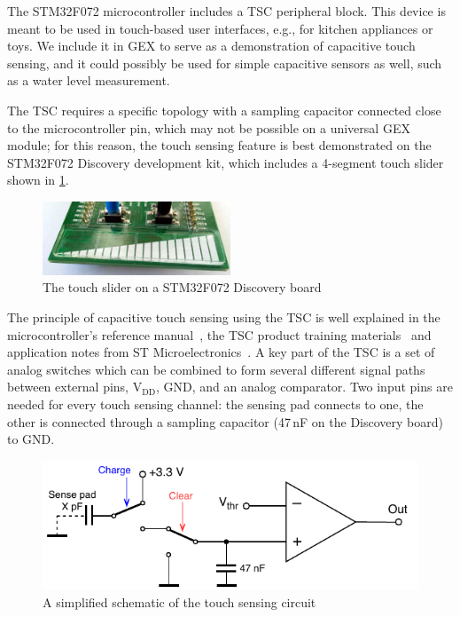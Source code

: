 The STM32F072 microcontroller includes a \gls{TSC} peripheral block. This device is meant to be used in touch-based user interfaces, e.g., for kitchen appliances or toys. We include it in GEX to serve as a demonstration of capacitive touch sensing, and it could possibly be used for simple capacitive sensors as well, such as a water level measurement.

The \gls{TSC} requires a specific topology with a sampling capacitor connected close to the microcontroller pin, which may not be possible on a universal GEX module; for this reason, the touch sensing feature is best demonstrated on the STM32F072 Discovery development kit, which includes a 4-segment touch slider shown in \cref{fig:disco_touch}.

\begin{figure}[h]
	\centering
	\includegraphics[width=0.5\textwidth] {img/disco-touch.jpg}
	\caption{\label{fig:disco_touch}The touch slider on a STM32F072 Discovery board}
\end{figure}

The principle of capacitive touch sensing using the \gls{TSC} is well explained in the microcontroller's reference manual~\cite{f072-rm}, the \gls{TSC} product training materials~\cite{stm-tsc-training, stm-tsc-ppt} and application notes from ST Microelectronics~\cite{stm-tsc-an1, stm-tsc-an2, stm-tsc-an3, stm-tsc-an4}. A key part of the \gls{TSC} is a set of analog switches which can be combined to form several different signal paths between external pins, V$_\mathrm{DD}$, \gls{GND}, and an analog comparator. Two input pins are needed for every touch sensing channel: the sensing pad connects to one, the other is connected through a sampling capacitor  (47\,nF on the Discovery board) to \gls{GND}.

\begin{figure}[h]
	\centering
	\includegraphics[scale=1] {img/tsc-function.pdf}
	\caption{\label{fig:tsc_schem}A simplified schematic of the touch sensing circuit}
\end{figure}

